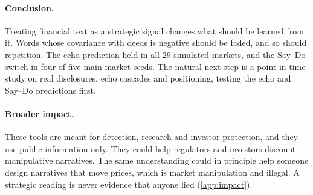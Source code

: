 \documentclass{article}
\theoremstyle{plain}
\theoremstyle{definition}
\theoremstyle{remark}
\begin{document}
\paragraph{Conclusion.} Treating financial text as a strategic signal changes what should be learned from it. Words whose covariance with deeds is negative should be faded, and so should repetition. The echo prediction held in all $29$ simulated markets, and the Say--Do switch in four of five main-market seeds. The natural next step is a point-in-time study on real disclosures, echo cascades and positioning, testing the echo and Say--Do predictions first.

\paragraph{Broader impact.} These tools are meant for detection, research and investor protection, and they use public information only. They could help regulators and investors discount manipulative narratives. The same understanding could in principle help someone design narratives that move prices, which is market manipulation and illegal. A strategic reading is never evidence that anyone lied (\cref{app:impact}).
\end{document}
